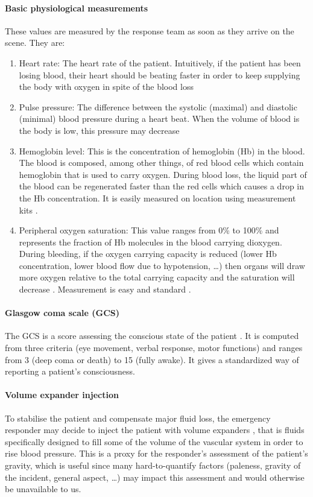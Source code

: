 \paragraph{Basic physiological measurements}
These values are measured by the response team as soon as they arrive on the scene. They are:
\begin{enumerate}
\item Heart rate: The heart rate of the patient. Intuitively, if the patient has been losing blood, their heart should be beating faster in order to keep supplying the body with oxygen in spite of  the blood loss \cite{gutierrez2004clinical}
\item Pulse pressure: The difference between the systolic (maximal) and diastolic (minimal) blood pressure during a heart beat. When the volume of blood is the body is low, this pressure may decrease \cite{gutierrez2004clinical}
\item Hemoglobin level: This is the concentration of hemoglobin (Hb) in the blood. The blood is composed, among other things, of red blood cells which contain hemoglobin that is used to carry oxygen. During blood loss, the liquid part of the blood can be regenerated faster than the red cells \cite{gutierrez2004clinical} which causes a drop in the Hb concentration. It is easily measured on location using measurement kits \cite{lamhaut2011hemocue}.
\item Peripheral oxygen saturation: This value ranges from 0\% to 100\% and represents the fraction of Hb molecules in the blood carrying dioxygen. During bleeding, if the oxygen carrying capacity is reduced (lower Hb concentration, lower blood flow due to hypotension, \ldots) then organs will draw more oxygen  relative to the total carrying capacity and the saturation will decrease \cite{cohn2007saturation}. Measurement is easy and standard \cite{rall1999oxymetry}.
\end{enumerate}

\paragraph{Glasgow coma scale (GCS)}
The GCS is a score assessing the conscious state of the patient \cite{jones1979GCS}. It is computed from three criteria (eye movement, verbal response, motor functions) and ranges from 3 (deep coma or death) to 15 (fully awake). It gives a standardized way of reporting a patient's consciousness.

\paragraph{Volume expander injection}
To stabilise the patient and compensate major fluid loss, the emergency responder may decide to inject the patient with volume expanders \cite{kramer2003expander}, that is fluids specifically designed to fill some of the volume of the vascular system in order to rise blood pressure. This is a proxy for the responder's assessment of the patient's gravity, which is useful since many hard-to-quantify factors (paleness, gravity of the incident, general aspect, \ldots) may impact this assessment and would otherwise be unavailable to us.

